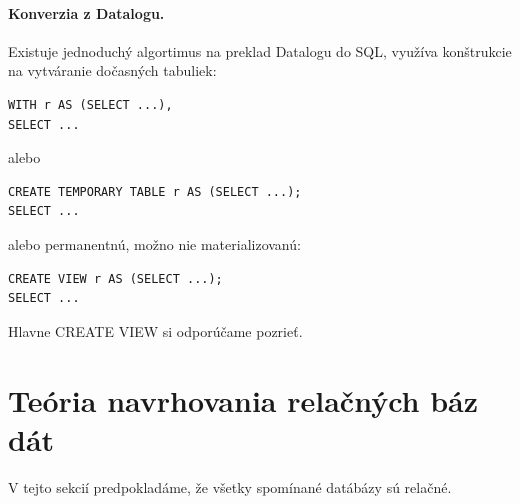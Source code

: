 \documentclass[10pt,a4paper]{article}
\begin{document}
\paragraph{Konverzia z Datalogu.}
Existuje jednoduchý algortimus na preklad Datalogu do SQL,
využíva konštrukcie na vytváranie dočasných tabuliek: 
\begin{verbatim}
WITH r AS (SELECT ...),
SELECT ...
\end{verbatim} 
alebo
\begin{verbatim}
CREATE TEMPORARY TABLE r AS (SELECT ...);
SELECT ...
\end{verbatim}
alebo permanentnú, možno nie materializovanú: 
\begin{verbatim}
CREATE VIEW r AS (SELECT ...);
SELECT ...
\end{verbatim}

Hlavne CREATE VIEW si odporúčame pozrieť. 

\section{Teória navrhovania relačných báz dát} 

V tejto sekcií predpokladáme, že všetky spomínané datábázy sú relačné. 
\end{document}
